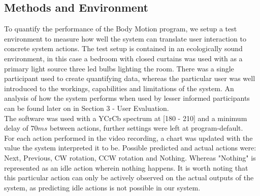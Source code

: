 \documentclass[11pt,a4paper]{article}
\begin{document}
\subsection{Methods and Environment}
To quantify the performance of the Body Motion program, we setup a test environment to measure how well the system can translate user interaction to concrete system actions. The test setup is contained in an ecologically sound environment, in this case a bedroom with closed curtains was used with as a primary light source three led bulbs lighting the room. There was a single participant used to create quantifying data, whereas the particular user was well introduced to the workings, capabilities and limitations of the system. An analysis of how the system performs when used by lesser informed participants can be found later on in Section 3 - User Evaluation.
\\ The software was used with a YCrCb spectrum at [180 - 210] and a minimum delay of $70ms$ between actions, further settings were left at program-default.
\\ For each action performed in the video recording, a chart was updated with the value the system interpreted it to be. Possible predicted and actual actions were: Next, Previous, CW rotation, CCW rotation and Nothing. Whereas "Nothing" is represented as an idle action wherein nothing happens. It is worth noting that this particular action can only be actively observed on the actual outputs of the system, as predicting idle actions is not possible in our system.
\end{document}

